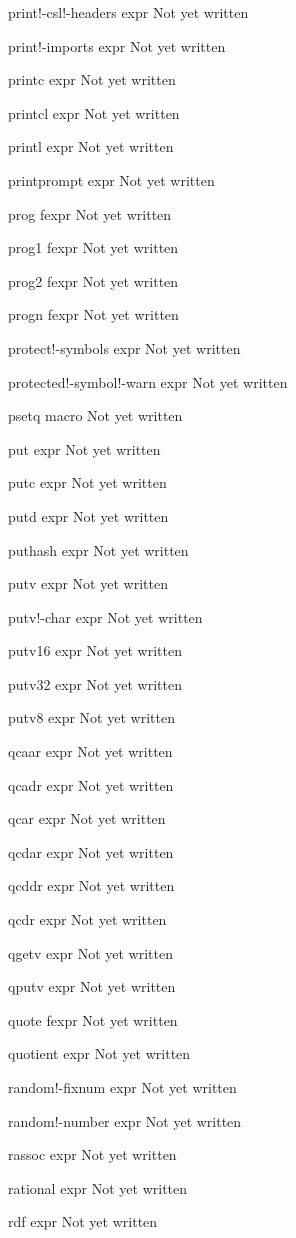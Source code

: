 \documentclass[a4paper,11pt]{article}
\begin{document}
\begin{description}
print!-csl!-headers expr
Not yet written

print!-imports expr
Not yet written

printc expr
Not yet written

printcl expr
Not yet written

printl expr
Not yet written

printprompt expr
Not yet written

prog fexpr
Not yet written

prog1 fexpr
Not yet written

prog2 fexpr
Not yet written

progn fexpr
Not yet written

protect!-symbols expr
Not yet written

protected!-symbol!-warn expr
Not yet written

psetq macro
Not yet written

put expr
Not yet written

putc expr
Not yet written

putd expr
Not yet written

puthash expr
Not yet written

putv expr
Not yet written

putv!-char expr
Not yet written

putv16 expr
Not yet written

putv32 expr
Not yet written

putv8 expr
Not yet written

qcaar expr
Not yet written

qcadr expr
Not yet written

qcar expr
Not yet written

qcdar expr
Not yet written

qcddr expr
Not yet written

qcdr expr
Not yet written

qgetv expr
Not yet written

qputv expr
Not yet written

quote fexpr
Not yet written

quotient expr
Not yet written

random!-fixnum expr
Not yet written

random!-number expr
Not yet written

rassoc expr
Not yet written

rational expr
Not yet written

rdf expr
Not yet written


\end{description}
\end{document}
